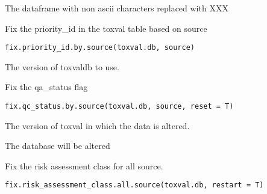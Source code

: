\documentclass[letterpaper]{book}
\begin{document}
%
\begin{Value}
The dataframe with non ascii characters replaced with XXX
\end{Value}
%
\begin{Description}\relax
Fix the priority\_id in the toxval table based on source
\end{Description}
%
\begin{Usage}
\begin{verbatim}
fix.priority_id.by.source(toxval.db, source)
\end{verbatim}
\end{Usage}
%
\begin{Arguments}
\begin{ldescription}
\item[\code{toxval.db}] The version of toxvaldb to use.
\end{ldescription}
\end{Arguments}
%
\begin{Description}\relax
Fix the qa\_status flag
\end{Description}
%
\begin{Usage}
\begin{verbatim}
fix.qc_status.by.source(toxval.db, source, reset = T)
\end{verbatim}
\end{Usage}
%
\begin{Arguments}
\begin{ldescription}
\item[\code{toxval.db}] The version of toxval in which the data is altered.
\end{ldescription}
\end{Arguments}
%
\begin{Value}
The database will be altered
\end{Value}
%
\begin{Description}\relax
Fix the risk assessment class for all source.
\end{Description}
%
\begin{Usage}
\begin{verbatim}
fix.risk_assessment_class.all.source(toxval.db, restart = T)
\end{verbatim}
\end{Usage}
\end{document}
